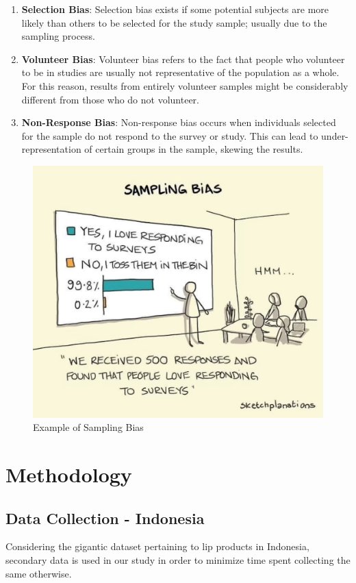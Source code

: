 \documentclass{article}
\begin{document}
\begin{enumerate}
    \item \textbf{Selection Bias}: Selection bias exists if some potential subjects are more likely than others to be selected for the study sample; usually due to the sampling process.

    \item \textbf{Volunteer Bias}: Volunteer bias refers to the fact that people who volunteer to be in studies are usually not representative of the population as a whole. For this reason, results from entirely volunteer samples might be considerably different from those who do not volunteer.

    \item \textbf{Non-Response Bias}: Non-response bias occurs when individuals selected for the sample do not respond to the survey or study. This can lead to under-representation of certain groups in the sample, skewing the results.
\end{enumerate}
\begin{figure}[htbp]
    \centering
    \includegraphics[scale = 0.25]{../images/sampling_bias_meme.jpeg}
    \caption{Example of Sampling Bias}
    \label{Sampling_Bias}
\end{figure}
\newpage
\section{Methodology}
\subsection{Data Collection - Indonesia}
Considering the gigantic dataset pertaining to lip products in Indonesia, secondary data is used in our study in order to minimize time spent collecting the same otherwise. \\
\end{document}
